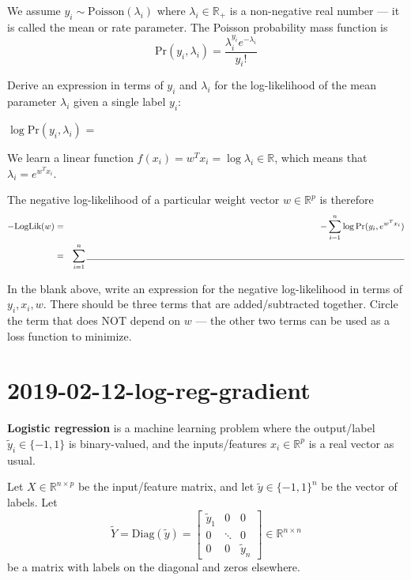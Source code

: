 \documentclass{article}
\begin{document}
We assume $y_i\sim \text{Poisson}(\lambda_i)$ where
$\lambda_i\in\mathbb R_+$ is a non-negative real number --- it is
called the mean or rate parameter. The Poisson probability mass function is
\begin{equation*}
  \text{Pr}(y_i, \lambda_i) = \frac{\lambda_i^{y_i} e^{-\lambda_i}}{y_i!}
\end{equation*}

Derive an expression in terms of $y_i$ and $\lambda_i$ for the
log-likelihood of the mean parameter $\lambda_i$ given a single label
$y_i$: 

\vskip 1in

$\log\text{Pr}(y_i, \lambda_i)$ = \underline{\hspace{5in}}

We learn a linear function
$f(x_i)=w^T x_i = \log \lambda_i\in\mathbb R$, which means that
$\lambda_i = e^{w^T x_i}$. 

The negative log-likelihood of a particular weight vector
$w\in\mathbb R^p$ is therefore
\begin{eqnarray*}
  -\text{LogLik}(w) &=& - \sum_{i=1}^n \log\text{Pr}(y_i, e^{w^T x_i})\\
\vspace{ 1in}
  &=& \sum_{i=1}^n \underline{\hspace{5in}}
\end{eqnarray*}

In the blank above, write an expression for the negative log-likelihood in terms of $y_i,x_i,w$. There should be three terms that are
added/subtracted together. Circle the term that does NOT depend on $w$
--- the other two terms can be used as a loss function to minimize.

\newpage
\section{2019-02-12-log-reg-gradient}
\textbf{Logistic regression} is a  machine learning problem
where the output/label $\tilde y_i\in\{-1,1 \}$ is binary-valued, and
the inputs/features $x_i\in\mathbb R^p$ is a real vector as usual. 

Let $X\in \mathbb R^{n\times p}$ be the input/feature matrix, and let
$\tilde y\in\{-1,1\}^n$ be the vector of labels. Let
\begin{equation*}
  \tilde Y = \text{Diag}(\tilde y)=\left[
    \begin{array}{ccc}
      \tilde y_1& 0&0\\
      0 & \ddots & 0\\
      0 & 0 & \tilde y_n
    \end{array}
\right]\in\mathbb R^{n\times n}
\end{equation*} 
be a matrix with labels on the diagonal and zeros elsewhere.
\end{document}
